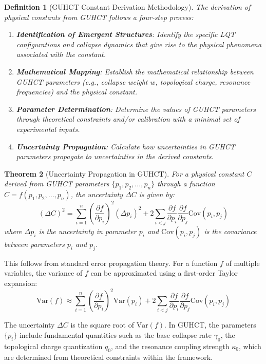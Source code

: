 \documentclass[11pt,a4paper]{article}
\makeatletter
\newtheorem{theorem}{Theorem}[section]
\newtheorem{definition}[theorem]{Definition}
\renewenvironment{proof}[1][\proofname]{\par
  \pushQED{\qed}%
  \normalfont \topsep6\p@\@plus6\p@\relax
  \trivlist
  \item[\hskip\labelsep
        \itshape
    #1\@addpunct{.}]\ignorespaces
}{%
  \popQED\endtrivlist\@endpefalse
}
\makeatother
\begin{document}
\begin{definition}[GUHCT Constant Derivation Methodology]
\label{def:constant_derivation}
The derivation of physical constants from GUHCT follows a four-step process:
\begin{enumerate}
    \item \textbf{Identification of Emergent Structures}: Identify the specific LQT configurations and collapse dynamics that give rise to the physical phenomena associated with the constant.
    
    \item \textbf{Mathematical Mapping}: Establish the mathematical relationship between GUHCT parameters (e.g., collapse weight $w$, topological charge, resonance frequencies) and the physical constant.
    
    \item \textbf{Parameter Determination}: Determine the values of GUHCT parameters through theoretical constraints and/or calibration with a minimal set of experimental inputs.
    
    \item \textbf{Uncertainty Propagation}: Calculate how uncertainties in GUHCT parameters propagate to uncertainties in the derived constants.
\end{enumerate}
\end{definition}

\begin{theorem}[Uncertainty Propagation in GUHCT]
\label{thm:uncertainty_propagation}
For a physical constant $C$ derived from GUHCT parameters $\{p_1, p_2, \ldots, p_n\}$ through a function $C = f(p_1, p_2, \ldots, p_n)$, the uncertainty $\Delta C$ is given by:
\begin{equation}
(\Delta C)^2 = \sum_{i=1}^{n} \left(\frac{\partial f}{\partial p_i}\right)^2 (\Delta p_i)^2 + 2\sum_{i<j} \frac{\partial f}{\partial p_i}\frac{\partial f}{\partial p_j} \text{Cov}(p_i, p_j)
\label{eq:uncertainty_prop} %
\end{equation}
where $\Delta p_i$ is the uncertainty in parameter $p_i$ and $\text{Cov}(p_i, p_j)$ is the covariance between parameters $p_i$ and $p_j$.
\end{theorem}

\begin{proof}
This follows from standard error propagation theory. For a function $f$ of multiple variables, the variance of $f$ can be approximated using a first-order Taylor expansion:
\begin{equation}
\text{Var}(f) \approx \sum_{i=1}^{n} \left(\frac{\partial f}{\partial p_i}\right)^2 \text{Var}(p_i) + 2\sum_{i<j} \frac{\partial f}{\partial p_i}\frac{\partial f}{\partial p_j} \text{Cov}(p_i, p_j)
\label{eq:variance_taylor} %
\end{equation}

The uncertainty $\Delta C$ is the square root of $\text{Var}(f)$. In GUHCT, the parameters $\{p_i\}$ include fundamental quantities such as the base collapse rate $\gamma_0$, the topological charge quantization $q_0$, and the resonance coupling strength $\kappa_0$, which are determined from theoretical constraints within the framework.
\end{proof}
\end{document}
